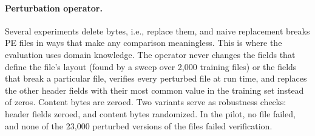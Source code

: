 \paragraph{Perturbation operator.} Several experiments delete bytes, i.e., replace them, and naive replacement breaks PE files in ways that make any comparison meaningless. This is where the evaluation uses domain knowledge. The operator never changes the fields that define the file's layout (found by a sweep over 2{,}000 training files) or the fields that break a particular file, verifies every perturbed file at run time, and replaces the other header fields with their most common value in the training set instead of zeros. Content bytes are zeroed. Two variants serve as robustness checks: header fields zeroed, and content bytes randomized. In the pilot, no file failed, and none of the 23{,}000 perturbed versions of the files failed verification.

